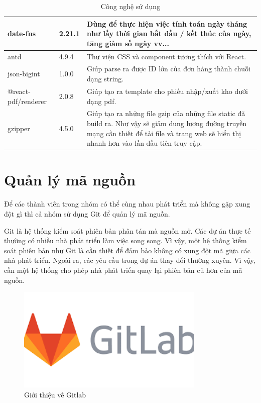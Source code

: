 \begin{table}[!htp]
\begin{tabular}{|l|l|m{20em}|}
			\hline
			date-fns & 2.21.1 & Dùng để thực hiện việc tính toán ngày tháng như lấy thời gian bắt đầu / kết thúc của ngày, tăng giảm số ngày vv... \\
			\hline
			antd & 4.9.4 &Thư viện CSS và component tương thích với React. \\
			\hline
			json-bigint & 1.0.0 &  Giúp parse ra được ID lớn của đơn hàng thành chuỗi dạng string. \\
			\hline
			@react-pdf/renderer & 2.0.8 & Giúp tạo ra template cho phiếu nhập/xuất kho dưới dạng pdf. \\
			\hline
			gzipper & 4.5.0 & Giúp tạo ra những file gzip của những file static đã build ra. Như vậy sẽ giảm dung lượng đường truyền mạng cần thiết để tải file và trang web sẽ hiển thị nhanh hơn vào lần đầu tiên truy cập. \\
			\hline
		\end{tabular}
		\caption{Công nghệ sử dụng}
	\end{table}


 


\section{Quản lý mã nguồn}
	
	Để các thành viên trong nhóm có thể cùng nhau phát triển mà không gặp xung đột gì thì cả nhóm sử dụng Git để quản lý mã nguồn. 
	
	Git là hệ thống kiểm soát phiên bản phân tán mà nguồn mở. Các dự án thực tế thường có nhiều nhà phát triển làm việc song song. Vì vậy, một hệ thống kiểm soát phiên bản như Git là cần thiết để đảm bảo không có xung đột mã giữa các nhà phát triển. Ngoài ra, các yêu cầu trong dự án thay đổi thường xuyên. Vì vậy, cần một hệ thống cho phép nhà phát triển quay lại phiên bản cũ hơn của mã nguồn.
	
	\begin{figure}[!ht]
		\includegraphics[width=0.8\textwidth]{Images/gitlab.png}
		\centering
		\linebreak
		\caption{Giới thiệu về Gitlab}
	\end{figure}
	
